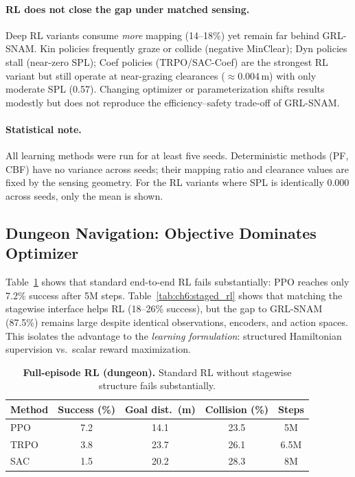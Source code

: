 \paragraph{RL does not close the gap under matched sensing.}
Deep RL variants consume \emph{more} mapping (14--18\%) yet remain
far behind GRL-SNAM.
Kin policies frequently graze or collide (negative MinClear);
Dyn policies stall (near-zero SPL);
Coef policies (TRPO/SAC-Coef) are the strongest RL variant but still
operate at near-grazing clearances ($\approx$0.004\,m) with only
moderate SPL (0.57).
Changing optimizer or parameterization shifts results modestly but does
not reproduce the efficiency--safety trade-off of GRL-SNAM.

\paragraph{Statistical note.}
All learning methods were run for at least five seeds.
Deterministic methods (PF, CBF) have no variance across seeds;
their mapping ratio and clearance values are fixed by the sensing geometry.
For the RL variants where SPL is identically 0.000 across seeds, only
the mean is shown.

\subsection{Dungeon Navigation: Objective Dominates Optimizer}
\label{subsec:ch6:dungeon}

Table~\ref{tab:ch6:full_rl} shows that standard end-to-end RL fails
substantially: PPO reaches only 7.2\% success after 5M steps.
Table~\ref{tab:ch6:staged_rl} shows that matching the stagewise interface
helps RL (18--26\% success), but the gap to GRL-SNAM (87.5\%)
remains large despite identical observations, encoders, and action spaces.
This isolates the advantage to the \emph{learning formulation}: structured
Hamiltonian supervision vs.\ scalar reward maximization.

\begin{table}[htbp]
\centering
\caption{\textbf{Full-episode RL (dungeon).} Standard RL without
  stagewise structure fails substantially.}
\label{tab:ch6:full_rl}
\small
\begin{tabular}{lcccc}
\toprule
\textbf{Method} & \textbf{Success (\%)} & \textbf{Goal dist.\ (m)} &
\textbf{Collision (\%)} & \textbf{Steps} \\
\midrule
PPO  & 7.2  & 14.1 & 23.5 & 5M \\
TRPO & 3.8  & 23.7 & 26.1 & 6.5M \\
SAC  & 1.5  & 20.2 & 28.3 & 8M \\
\bottomrule
\end{tabular}
\end{table}

